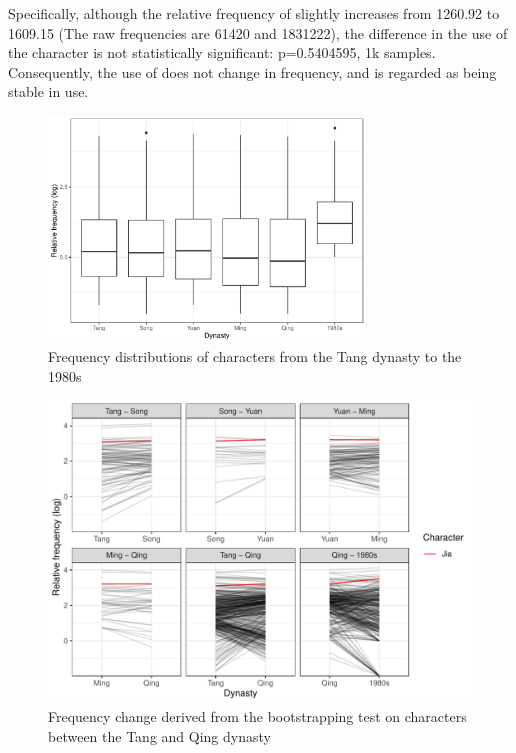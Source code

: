 Specifically, although the relative frequency of \jia slightly increases from \num{1260.92} to \num{1609.15} (The raw frequencies are \num{61420} and \num{1831222}), the difference in the use of the character is not statistically significant: p=0.5404595, 1k samples. Consequently, the use of \jia does not change in frequency, and is regarded as being stable in use.

\begin{figure}[H]
\centering
\includegraphics[width=0.75\textwidth,keepaspectratio]{figures_new/char_freq_dist_boxplot.pdf}
\caption{Frequency distributions of characters from the Tang dynasty to the 1980s}
\end{figure}

\begin{figure}[H]
\centering
\includegraphics[height=0.4\textheight,keepaspectratio]{figures_new/char_freq_change_lineplot.pdf}
\caption{Frequency change derived from the bootstrapping test on characters between the Tang and Qing dynasty}
\label{fig:freq_boot}
\end{figure}

